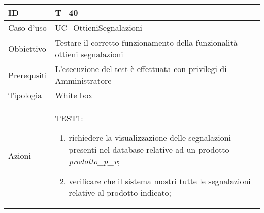 \begin{table}[hb]
    \centering
    \begin{tabular}{ |p{2cm}|p{10cm}|  }
        \hline
        ID          & T\_40                                                                              \\\hline
        Caso d'uso  & UC\_OttieniSegnalazioni                                                           \\\hline
        Obbiettivo  & Testare il corretto funzionamento della funzionalità ottieni segnalazioni \\\hline
        Prerequsiti & L'esecuzione del test è effettuata con privilegi di Amministratore                         \\\hline
        Tipologia   & White box                                                                          \\\hline
        Azioni      &
        TEST1:
        \begin{enumerate}[nosep, topsep=0pt]
            \item richiedere la visualizzazione delle segnalazioni presenti nel database relative ad un prodotto \emph{prodotto\_p\_v};
            \item verificare che il sistema mostri tutte le segnalazioni relative al prodotto indicato;
        \end{enumerate}
        \\\hline
    \end{tabular}
\end{table}


